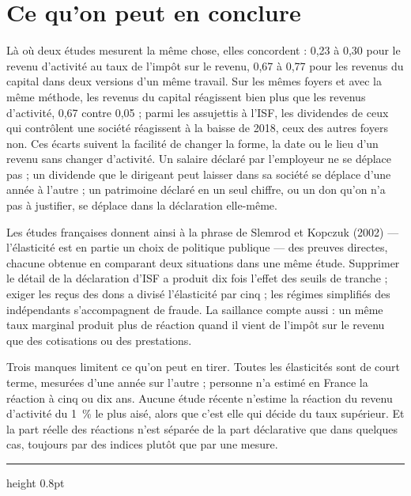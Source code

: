 \documentclass[11pt,a4paper]{article}
\begin{document}
\section{Ce qu'on peut en conclure}

Là où deux études mesurent la même chose, elles concordent : 0,23 à 0,30 pour le revenu d'activité
au taux de l'impôt sur le revenu, 0,67 à 0,77 pour les revenus du capital dans deux versions d'un
même travail. Sur les mêmes foyers et avec la même méthode, les revenus du capital réagissent bien
plus que les revenus d'activité, 0,67 contre 0,05 ; parmi les assujettis à l'ISF, les dividendes de
ceux qui contrôlent une société réagissent à la baisse de 2018, ceux des autres foyers non. Ces
écarts suivent la facilité de changer la forme, la date ou le lieu d'un revenu sans changer
d'activité. Un salaire déclaré par l'employeur ne se déplace pas ; un dividende que le dirigeant peut
laisser dans sa société se déplace d'une année à l'autre ; un patrimoine déclaré en un seul chiffre,
ou un don qu'on n'a pas à justifier, se déplace dans la déclaration elle-même.

Les études françaises donnent ainsi à la phrase de Slemrod et Kopczuk (2002) --- l'élasticité est en
partie un choix de politique publique --- des preuves directes, chacune obtenue en comparant deux
situations dans une même étude. Supprimer le détail de la déclaration d'ISF a produit dix fois
l'effet des seuils de tranche ; exiger les reçus des dons a divisé
l'élasticité par cinq ; les régimes simplifiés des indépendants s'accompagnent de fraude. La
saillance compte aussi : un même taux marginal produit plus de réaction quand il vient de l'impôt sur
le revenu que des cotisations ou des prestations.

Trois manques limitent ce qu'on peut en tirer. Toutes les élasticités sont de court terme, mesurées
d'une année sur l'autre ; personne n'a estimé en France la réaction à cinq ou dix ans. Aucune étude
récente n'estime la réaction du revenu d'activité du 1~\% le plus aisé, alors que c'est elle qui
décide du taux supérieur. Et la part réelle des réactions n'est séparée de la part déclarative que
dans quelques cas, toujours par des indices plutôt que par une mesure.

\vspace{1.2em}
{\color{bleu}\hrule height 0.8pt}
\vspace{0.8em}
\end{document}
